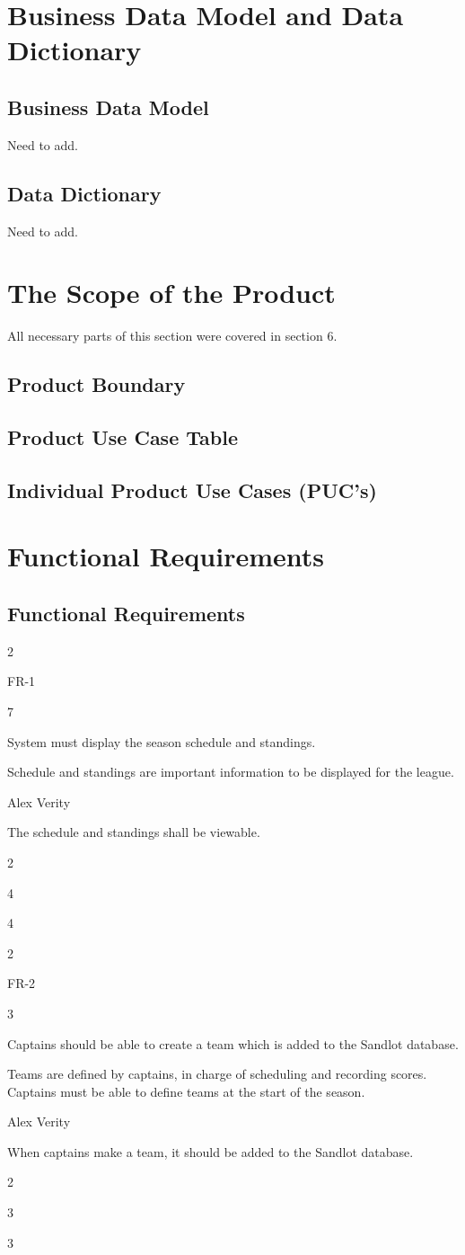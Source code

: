 \documentclass[12pt]{article}
\newenvironment{myreq}[1]{%
\setlist[description]{font=\normalfont\color{darkgray}}%
\begin{tcolorbox}[colframe=black,colback=white, sharp corners, boxrule=1pt]%
\bfseries\color{blue}%
\begin{description}#1}%
{\end{description}\end{tcolorbox}}
\newcommand{\twoinline}[2]{\begin{multicols}{2}#1 #2\end{multicols}}
\newcommand{\reqno}{\item[Requirement \#:]}
\newcommand{\reqevent}{\item[Event/BUC/PUC \#:]}
\newcommand{\reqdesc}{\item[Description:]}
\newcommand{\reqrat}{\item[Rationale:]}
\newcommand{\reqorig}{\item[Originator:]}
\newcommand{\reqfit}{\item[Fit Criterion:]}
\newcommand{\reqsatis}{\item[Customer Satisfaction:]}
\newcommand{\reqdissat}{\item[Customer Dissatisfaction:]}
\begin{document}
\section{Business Data Model and Data Dictionary}
\subsection{Business Data Model}
Need to add.

\subsection{Data Dictionary}
Need to add.

\section{The Scope of the Product}
All necessary parts of this section were covered in section 6.
\subsection{Product Boundary}

\subsection{Product Use Case Table}

\subsection{Individual Product Use Cases (PUC's)}


\section{Functional Requirements}
\subsection{Functional Requirements}

\begin{myreq}
  \twoinline
    {\reqno FR-1}
    {\reqevent 7}
  \reqdesc System must display the season schedule and standings.
  \reqrat Schedule and standings are important information to be displayed for the league.
  \reqorig Alex Verity
  \reqfit The schedule and standings shall be viewable.
  \twoinline
    {\reqsatis 4}
    {\reqdissat 4}
\end{myreq}

\begin{myreq}
  \twoinline
    {\reqno FR-2}
    {\reqevent 3}
  \reqdesc Captains should be able to create a team which is added to the
  Sandlot database.
  \reqrat Teams are defined by captains, in charge of scheduling and
  recording scores. Captains must be able to define teams at the start of the
  season.
  \reqorig Alex Verity
  \reqfit When captains make a team, it should be added to the Sandlot
  database.
  \twoinline
    {\reqsatis 3}
    {\reqdissat 3}
\end{myreq}
\end{document}

